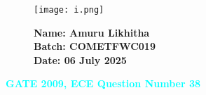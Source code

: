 \documentclass[12pt]{article}
\begin{document}
\begin{figure}[H]
    \begin{minipage}{0.45\textwidth}
        \texttt{[image: i.png]} %
    \end{minipage} \hfill
    \begin{minipage}{0.45\textwidth}
        \textbf{Name: Amuru Likhitha} \\
        \textbf{Batch: COMETFWC019} \\
        \textbf{Date: 06 July 2025}
    \end{minipage}
\end{figure}

\begin{center}
    {\LARGE \textbf{\textcolor{cyan}{GATE 2009, ECE Question Number 38}}}
\end{center}
\vspace{1em}
\end{document}
